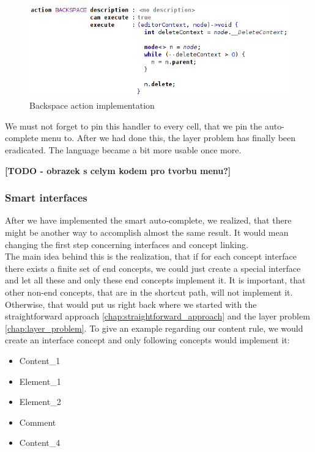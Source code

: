 \begin{figure}[h]
	\centering
	\includegraphics[width=\textwidth]{./img/backspace_action.png}
	\caption{Backspace action implementation}
	\label{fig:backspace_action}
\end{figure}

We must not forget to pin this handler to every cell, that we pin the auto-complete menu to.
After we had done this, the layer problem has finally been eradicated.
The language became a bit more usable once more.

\textbf{[TODO - obrazek s celym kodem pro tvorbu menu?]}

\subsubsection{Smart interfaces}

After we have implemented the smart auto-complete, we realized, that there might be another way to accomplish almost the same result.
It would mean changing the first step concerning interfaces and concept linking.
\\

The main idea behind this is the realization, that if for each concept interface there exists a finite set of end concepts, we could just create a special interface and let all these and only these end concepts implement it.
It is important, that other non-end concepts, that are in the shortcut path, will not implement it.
Otherwise, that would put us right back where we started with the straightforward approach \ref{chap:straightforward_approach} and the layer problem \ref{chap:layer_problem}.
To give an example regarding our content rule, we would create an  interface concept and only following concepts would implement it:

\begin{itemize}
	\itemsep0em
	\item Content{\_}1
	\item Element{\_}1
	\item Element{\_}2
	\item Comment
	\item Content{\_}4
\end{itemize}

